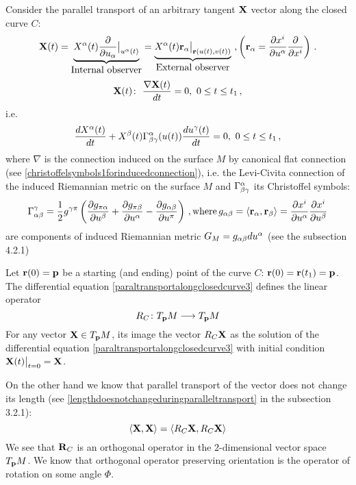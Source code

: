 \documentclass[12pt]{article}
\theoremstyle{theorem}
\numberwithin{equation}{section}
\begin{document}
{Consider the parallel transport of an arbitrary tangent ${\bf X}$ vector along the closed curve $C$:
          \begin{equation*}\label{paraltransportalongclosedcurve1}
{\bf X}(t)= \underbrace {X^\alpha(t){\partial\over \partial u_\alpha}\big\vert_{u^\alpha(t)}}_{\hbox{Internal observer}} =
 \underbrace{X^\alpha(t){\bf r}_\alpha\big\vert_{{\bf r}(u(t),v(t))}}_{\hbox{External observer}}\,\,,\left(
 {\bf r}_\alpha={\partial x^i\over \partial u^\alpha}{\partial\over \partial x^i}\right)\,.
          \end{equation*}
          \begin{equation*}\label{paraltransportalongclosedcurve2}
{\bf X}(t)\colon\,\, {\nabla {\bf X}(t)\over dt}=0,\,\, 0\leq t\leq t_1\,,
          \end{equation*}
i.e.
                \begin{equation}\label{paraltransportalongclosedcurve3}
{d X^\alpha(t)\over dt}+
X^\beta(t)\Gamma^\alpha_{\beta\gamma}(u(t))
{du^\gamma(t)\over dt}=0,\,\, 0\leq t\leq t_1\,,
          \end{equation}
where $\nabla$ is the connection induced on the surface $M$ by canonical flat connection
(see \eqref{christoffelsymbols1forinducedconnection}), i.e.
the Levi-Civita connection of the induced Riemannian metric on the surface $M$
 and $\Gamma^\alpha_{\beta\gamma}$ its Christoffel symbols:
\begin{equation}\label{connectioninduced12}
          \Gamma^\gamma_{\alpha\beta}={1\over 2}g^{\gamma\pi}
      \left({\partial g_{\pi \alpha}\over \partial u^\beta}+{\partial g_{\pi \beta}\over \partial u^\alpha}-
      {\partial g_{\alpha\beta}\over \partial u^\pi}\right)\,,{\rm where}\,
      g_{\alpha\beta}=\langle{\bf r}_\alpha,{\bf r}_\beta\rangle={\partial x^i\over \partial u^\alpha} {\partial x^i\over \partial u^\beta}
     \end{equation}
 are components of induced Riemannian metric
 $G_M=g_{\alpha\beta}du^\alpha$    (see the subsection 4.2.1)


Let ${\bf r}(0)={\bf p}$ be a starting (and ending) point of the curve $C$: ${\bf r}(0)={\bf r}(t_1)={\bf p}$.
The differential equation \eqref{paraltransportalongclosedcurve3} defines the linear operator
            \begin{equation}\label{linearoperatoroverclosedcurve}
            R_C\colon T_{{\bf p}}M\longrightarrow T_{{\bf p}}M
            \end{equation}
For any vector ${\bf X}\in T_{{\bf p}}M$, its image the vector $R_C{\bf X}$ as the solution of the differential equation
\eqref{paraltransportalongclosedcurve3} with initial condition ${\bf X}(t)\big\vert_{t=0}={\bf X}$.

On the other hand we know that parallel transport of the vector does not change its length (see
\eqref{lengthdoesnotchangeduringparalleltransport} in the subsection 3.2.1):
       \begin{equation}\label{linearoperatoroverclosedcurvescalarproduct}
            \langle{\bf X},{\bf X}\rangle=\langle R_C{\bf X},R_C{\bf X}\rangle
            \end{equation}
We see that ${\bf R}_C$ is an orthogonal operator in the $2$-dimensional vector space $T_{{\bf p}}M$.
We know that orthogonal operator preserving orientation is the operator of rotation on some angle $\Phi$.

}
\end{document}
